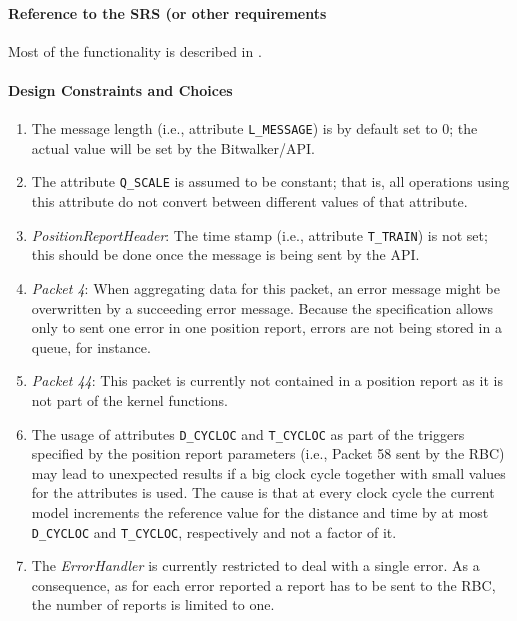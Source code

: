 \paragraph{Reference to the SRS (or other requirements}
Most of the functionality is described in \cite[Chapter~3.6.5]{subset-026}.

\paragraph{Design Constraints and Choices}
\begin{enumerate}
	\item The message length (i.e., attribute \verb+L_MESSAGE+) is by default set to 0; the actual value will be set by the Bitwalker/API.
	\item The attribute \verb+Q_SCALE+ is assumed to be constant; that is, all operations using this attribute do not convert between different values of that attribute.
	\item \textit{PositionReportHeader}: The time stamp (i.e., attribute \verb+T_TRAIN+) is not set; this should be done once the message is being sent by the API.
	\item \textit{Packet 4}: When aggregating data for this packet, an error message might be overwritten by a succeeding error message. Because the specification allows only to sent one error in one position report, errors are not being stored in a queue, for instance.
	\item \textit{Packet 44}: This packet is currently not contained in a position report as it is not part of the kernel functions.
	\item The usage of attributes \verb+D_CYCLOC+ and \verb+T_CYCLOC+ as part of the triggers specified by the position report parameters (i.e., Packet 58 sent by the RBC) may lead to unexpected results if a big clock cycle together with small values for the attributes is used. The cause is that at every clock cycle the current model increments the reference value for the distance and time by at most \verb+D_CYCLOC+ and \verb+T_CYCLOC+, respectively and not a factor of it.
	\item The \textit{ErrorHandler} is currently restricted to deal with a single error. As a consequence, as for each error reported a report has to be sent to the RBC, the number of reports is limited to one.
\end{enumerate}

